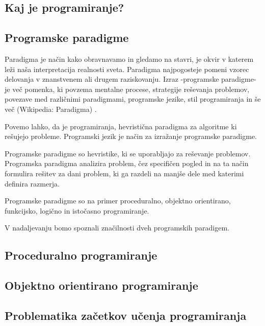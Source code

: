 \subsection{Kaj je programiranje?}
\label{sec:kaj_je_programiranje}


\subsection{Programske paradigme}
\label{sec:programske_paradigme}

Paradigma je način kako obravnavamo in gledamo na stavri, je okvir v
katerem leži naša interpretacija realnosti sveta. Paradigma
najpogosteje pomeni vzorec delovanja v znanstvenem ali drugem
raziskovanju.  Izraz -programske paradigme- je več pomenka, ki povzema
mentalne procese, strategije reševanja problemov, povezave med
različnimi paradigmami, programske jezike, stil programiranja in še
več (Wikipedia: Paradigma) \cite{guideTCS}.

Povemo lahko, da je programiranja, hevristična paradigma za algoritme
ki rešujejo probleme. Programski jezik je način za izražanje
programske paradigme.

Programske paradigme so hevristike, ki se uporabljajo za reševanje
problemov. Programska paradigma analizira problem, čez specifičen
pogled in na ta način formulira rešitev za dani problem, ki ga razdeli
na manjše dele med katerimi definira razmerja.

Programske paradigme so na primer proceduralno, objektno orientirano,
funkcijsko, logično in istočasno programiranje.

V nadaljevanju bomo spoznali značilnosti dveh programskih paradigem.

\subsection{Proceduralno programiranje}
\label{sec:proceduralno_programiranje}

\subsection{Objektno orientirano programiranje}
\label{sec:objektno_orijentirano_programiranje}



\subsection{Problematika začetkov učenja programiranja}
\label{sec:Problematika_začetkov_učenja_programiranja}

